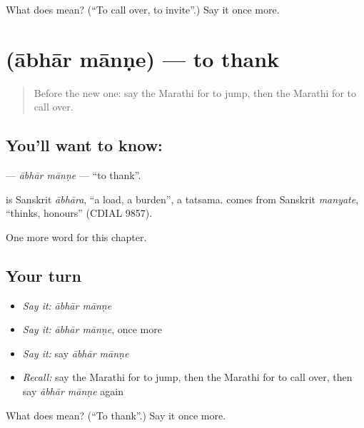 \begin{tcolorbox}[breakable,colback=teal!4,colframe=teal!35!black,title={Before you move on}]
What does  mean? (\textquotedblleft{}To call over, to invite\textquotedblright{}.) Say it once more.
\end{tcolorbox}
\section[\texorpdfstring{\mr{आभार} \mr{मानणे} (ābhār mānṇe)}{आभार मानणे (ābhār mānṇe)}]{  (ābhār mānṇe) — to thank}

\label{lesson:MR-C162-abhar-manne}



\begin{quote}
Before the new one: say the Marathi for to jump, then the Marathi for to call over.
\end{quote}

\subsection*{You'll want to know:  }
\textbf{ } — \emph{ābhār mānṇe} — \textquotedblleft{}to thank\textquotedblright{}.

\begin{cousinweb}
\textbf{} is Sanskrit \emph{ābhāra}, \textquotedblleft{}a load, a burden\textquotedblright{}, a tatsama. \textbf{} comes from Sanskrit \emph{manyate}, \textquotedblleft{}thinks, honours\textquotedblright{} (CDIAL 9857).
\end{cousinweb}

\begin{grammarlens}[title={What you've built}]
One more word for this chapter.
\end{grammarlens}

\subsection*{Your turn}
\begin{itemize}
\raggedright
  \item \emph{Say it:} \emph{ābhār mānṇe}
  \item \emph{Say it:} \emph{ābhār mānṇe}, once more
  \item \emph{Say it:} say \emph{ābhār mānṇe}
  \item \emph{Recall:} say the Marathi for to jump, then the Marathi for to call over, then say \emph{ābhār mānṇe} again
\end{itemize}

\begin{tcolorbox}[breakable,colback=teal!4,colframe=teal!35!black,title={Before you move on}]
What does   mean? (\textquotedblleft{}To thank\textquotedblright{}.) Say it once more.
\end{tcolorbox}
